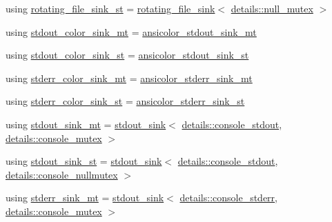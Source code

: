 \begin{DoxyCompactItemize}
\item 
using \hyperlink{namespacespdlog_1_1sinks_a694eff66a11012e2fbe3fa3a1c963c96}{rotating\+\_\+file\+\_\+sink\+\_\+st} = \hyperlink{classspdlog_1_1sinks_1_1rotating__file__sink}{rotating\+\_\+file\+\_\+sink}$<$ \hyperlink{structspdlog_1_1details_1_1null__mutex}{details\+::null\+\_\+mutex} $>$
\item 
using \hyperlink{namespacespdlog_1_1sinks_af5b53d274a7f3e3528ef994035cc7204}{stdout\+\_\+color\+\_\+sink\+\_\+mt} = \hyperlink{namespacespdlog_1_1sinks_a10475192b7db414c386fbccb7401d852}{ansicolor\+\_\+stdout\+\_\+sink\+\_\+mt}
\item 
using \hyperlink{namespacespdlog_1_1sinks_ae3eb6549df72c3c46dea34fd35fee93e}{stdout\+\_\+color\+\_\+sink\+\_\+st} = \hyperlink{namespacespdlog_1_1sinks_aa30d2f8d27e36f73043723a42199fd7b}{ansicolor\+\_\+stdout\+\_\+sink\+\_\+st}
\item 
using \hyperlink{namespacespdlog_1_1sinks_a58091bb55dd96f7e29ccc044338c054c}{stderr\+\_\+color\+\_\+sink\+\_\+mt} = \hyperlink{namespacespdlog_1_1sinks_aa12104ff6999c8908f687c3eb87d827e}{ansicolor\+\_\+stderr\+\_\+sink\+\_\+mt}
\item 
using \hyperlink{namespacespdlog_1_1sinks_adf8d38fe4201bc8f4b5255c4fbea7aae}{stderr\+\_\+color\+\_\+sink\+\_\+st} = \hyperlink{namespacespdlog_1_1sinks_a3d8d6c5070124583420003b8c00ec441}{ansicolor\+\_\+stderr\+\_\+sink\+\_\+st}
\item 
using \hyperlink{namespacespdlog_1_1sinks_a029d085d53a8f4ee99ba223f34bcfb28}{stdout\+\_\+sink\+\_\+mt} = \hyperlink{classspdlog_1_1sinks_1_1stdout__sink}{stdout\+\_\+sink}$<$ \hyperlink{structspdlog_1_1details_1_1console__stdout}{details\+::console\+\_\+stdout}, \hyperlink{structspdlog_1_1details_1_1console__mutex}{details\+::console\+\_\+mutex} $>$
\item 
using \hyperlink{namespacespdlog_1_1sinks_a98a1a892c6c8f44d89f2ec13e8a7f2c4}{stdout\+\_\+sink\+\_\+st} = \hyperlink{classspdlog_1_1sinks_1_1stdout__sink}{stdout\+\_\+sink}$<$ \hyperlink{structspdlog_1_1details_1_1console__stdout}{details\+::console\+\_\+stdout}, \hyperlink{structspdlog_1_1details_1_1console__nullmutex}{details\+::console\+\_\+nullmutex} $>$
\item 
using \hyperlink{namespacespdlog_1_1sinks_afa13b9dbe3db99f4112b17a310dc26de}{stderr\+\_\+sink\+\_\+mt} = \hyperlink{classspdlog_1_1sinks_1_1stdout__sink}{stdout\+\_\+sink}$<$ \hyperlink{structspdlog_1_1details_1_1console__stderr}{details\+::console\+\_\+stderr}, \hyperlink{structspdlog_1_1details_1_1console__mutex}{details\+::console\+\_\+mutex} $>$

\end{DoxyCompactItemize}
